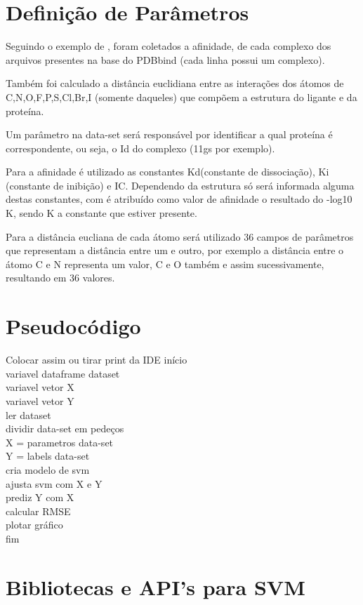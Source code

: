 \documentclass[tcc, capa]{texucpel}
\begin{document}
\section{Definição de Parâmetros}
Seguindo o exemplo de \cite{ballester2010machine}, foram coletados a afinidade, de cada complexo dos arquivos presentes na base do PDBbind (cada linha possui um complexo).

Também foi calculado a distância euclidiana entre as interações dos átomos de C,N,O,F,P,S,Cl,Br,I (somente daqueles) que compõem a estrutura do ligante e da proteína.

Um parâmetro na data-set será responsável por identificar a qual proteína é correspondente, ou seja, o Id do complexo (11gs por exemplo).

Para a afinidade é utilizado as constantes Kd(constante de dissociação), Ki (constante de inibição) e IC. 
Dependendo da estrutura só será informada alguma destas constantes, com é atribuído como valor de afinidade o resultado do -log10 K, sendo K a constante que estiver presente.

Para a distância eucliana de cada átomo será utilizado 36 campos de parâmetros que representam a distância entre um e outro, por exemplo a distância entre o átomo C e N representa um valor, C e O também e assim sucessivamente, resultando em 36 valores. 

\section{Pseudocódigo}

Colocar assim ou tirar print da IDE
início\\
 variavel dataframe dataset\\
 variavel vetor X\\
 variavel vetor Y\\
 ler dataset\\
 dividir data-set em pedeços\\
 X = parametros data-set\\
 Y = labels data-set\\
 cria modelo de svm  \\
 ajusta svm com X e Y\\
 prediz Y com X\\
 calcular RMSE\\
 plotar gráfico\\
fim\\

\section{Bibliotecas e API's para SVM}
\end{document}
